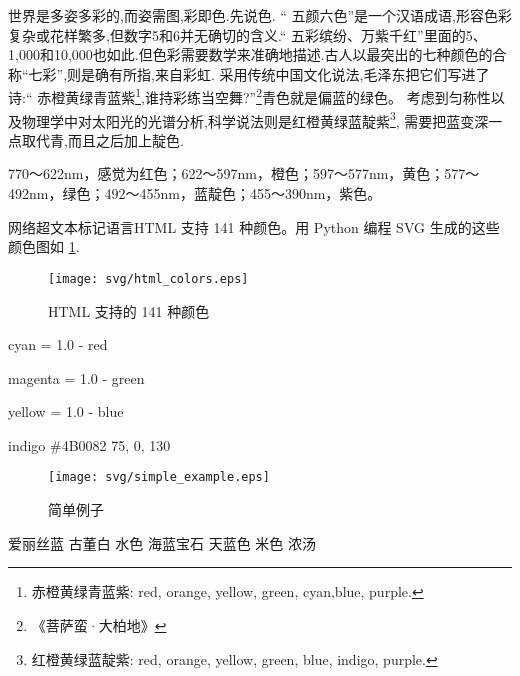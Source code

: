 \documentclass[main.tex]{subfiles}
\begin{document}
世界是多姿多彩的,而姿需图,彩即色.先说色.
“ 五颜六色”是一个汉语成语,形容色彩复杂或花样繁多,但数字5和6并无确切的含义.“ 五彩缤纷、万紫千红”里面的5、1,000和10,000也如此.但色彩需要数学来准确地描述.古人以最突出的七种颜色的合称“七彩”,则是确有所指,来自彩虹.
采用传统中国文化说法,毛泽东把它们写进了诗:“ 赤橙黄绿青蓝紫\footnote{赤橙黄绿青蓝紫: red, orange, yellow, green, cyan,blue, purple.},谁持彩练当空舞?”\footnote{《菩萨蛮·大柏地》}青色就是偏蓝的绿色。
考虑到匀称性以及物理学中对太阳光的光谱分析,科学说法则是红橙黄绿蓝靛紫\footnote{红橙黄绿蓝靛紫: red, orange, yellow, green, blue, indigo, purple.},
需要把蓝变深一点取代青,而且之后加上靛色.

770～622nm，感觉为红色；622～597nm，橙色；597～577nm，黄色；577～492nm，绿色；492～455nm，蓝靛色；455～390nm，紫色。

网络超文本标记语言HTML 支持 141 种颜色。用 Python 编程 SVG 生成的这些颜色图如 \ref{fig:1.4.2}.

\begin{figure}
	\centering
	\texttt{[image: svg/html\_colors.eps]}
	\caption{HTML 支持的 141 种颜色}
	\label{fig:1.4.2}
\end{figure}
cyan = 1.0 - red

magenta = 1.0 - green

yellow = 1.0 - blue

indigo \#4B0082 75, 0, 130

\begin{figure}
	\centering
	\texttt{[image: svg/simple\_example.eps]}
	\caption{简单例子}
	\label{fig:I.1.}
\end{figure}



爱丽丝蓝%
古董白%
水色%
海蓝宝石%
天蓝色%
米色%
浓汤%
\end{document}
